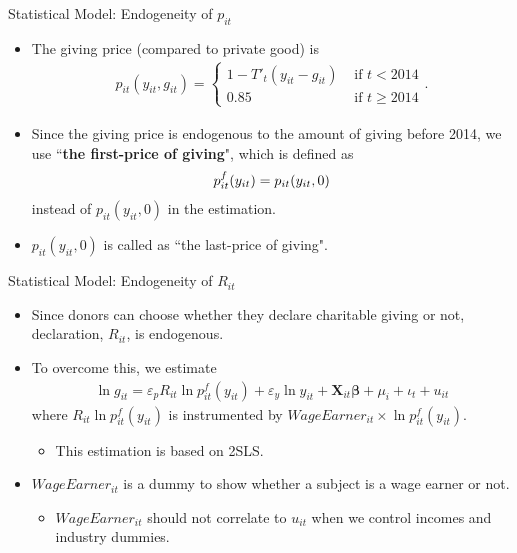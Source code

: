 \documentclass[dvipdfmx,10pt]{beamer}
\begin{document}
\begin{frame}{Statistical Model: Endogeneity of $p_{it}$}
	\begin{itemize}
		\item The giving price (compared to private good) is
		\begin{align}
			p_{it}(y_{it}, g_{it})=\begin{cases}
			1-T'_t(y_{it}-g_{it})&\text{ if }t<2014\\
			0.85&\text{ if }t\ge2014
			\end{cases}
			\tag{6'}.
		\end{align}
		\item Since the giving price is endogenous to the amount of giving before 2014, we use ``\textbf{the first-price of giving}", which is defined as 
		\begin{align}
			p_{it}^f(y_{it})=p_{it}(y_{it},0)\notag
		\end{align}
		 instead of $p_{it}(y_{it},0)$ in the estimation.
		\item $p_{it}(y_{it},0)$ is called as ``the last-price of giving".
	\end{itemize}
\end{frame}

\begin{frame}{Statistical Model: Endogeneity of $R_{it}$}
	\begin{itemize}
		\item Since donors can choose whether they declare charitable giving or not, declaration, $R_{it}$, is endogenous.
		\item To overcome this, we estimate 
		\begin{align}
			\ln g_{it} = \varepsilon_pR_{it} \ln p_{it}^f(y_{it}) + \varepsilon_y \ln y_{it} + \bm{X}_{it}\bm{\beta} + \mu_i + \iota_t + u_{it}\tag{7}
		\end{align}
	 	where $R_{it} \ln p_{it}^f(y_{it})$ is instrumented by $WageEarner_{it}\times \ln p^f_{it}(y_{it})$. 
	 	\begin{itemize}
	 		\item This estimation is based on 2SLS.
	 	\end{itemize}
		\item $WageEarner_{it}$ is a dummy to show whether a subject is a wage earner or not.
		\begin{itemize}
			\item $WageEarner_{it}$ should not correlate to $u_{it}$ when we control incomes and industry dummies.
		\end{itemize}
	\end{itemize}
\end{frame}
\end{document}
